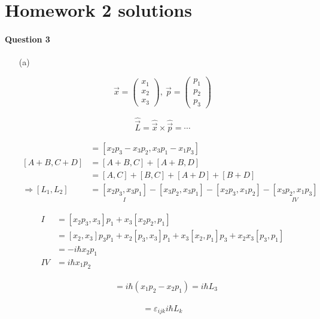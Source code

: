 \documentclass[11pt,a4paper]{article}
\author{Zehao Gao}
\begin{document}
%

\section{Homework 2 solutions}

\paragraph{Question 3}

\begin{enumerate}
\item[(a)]

\begin{equation*}
\vec{x}=
\begin{pmatrix}
x_1 \\
x_2 \\
x_3
\end{pmatrix},\ 
\vec{p}=
\begin{pmatrix}
p_1 \\
p_2 \\
p_3
\end{pmatrix}
\end{equation*}

\begin{equation*}
\hat{\vec{L}}=\hat{\vec{x}}\times\hat{\vec{p}}=\cdots
\end{equation*}

\begin{align*}
[\hat{L}_1,\hat{L}_2]&=[x_2p_3-x_3p_2,x_3p_1-x_1p_3]\\
[A+B,C+D]&=[A+B,C]+[A+B,D]\\
&=[A,C]+[B,C]+[A+D]+[B+D]\\
\Rightarrow
[L_1,L_2]&=\underset{I}{[x_2p_3,x_3p_1]}-[x_3p_2,x_3p_1]-[x_2p_3,x_1p_2]-\underset{IV}{[x_3p_2,x_1p_3]}
\end{align*}

\begin{align*}
I&=[x_2p_3,x_3]p_1+x_3[x_2p_2,p_1]\\
&=[x_2,x_3]p_3p_1+x_2[p_3,x_3]p_1+x_3[x_2,p_1]p_3+x_2x_3[p_3,p_1]\\
&=-i\hbar x_2p_1\\
IV&=i\hbar x_1p_2
\end{align*}

\begin{align*}
[L_1,L_2]&=i\hbar(x_1p_2-x_2p_1)=i\hbar L_3
\end{align*}

\begin{align*}
[L_i,L_j]=\varepsilon_{ijk}i\hbar L_k
\end{align*}

\end{enumerate}
\end{document}
